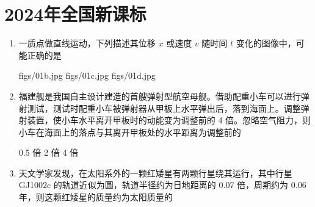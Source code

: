\documentclass[\gkver]{gaokaozhenti}
\begin{document}
\chapter{2024年全国新课标}

\begin{enumerate}
\item
一质点做直线运动，下列描述其位移 $x$ 或速度 $v$ 随时间 $t$ 变化的图像中，可能正确的是

{figs/01b.jpg}
{figs/01c.jpg}
{figs/01d.jpg}


\item
福建舰是我国自主设计建造的首艘弹射型航空母舰。借助配重小车可以进行弹射测试，测试时配重小车被弹射器从甲板上水平弹出后，落到海面上。调整弹射装置，使小车水平离开甲板时的动能变为调整前的 4 倍。忽略空气阻力，则小车在海面上的落点与其离开甲板处的水平距离为调整前的

{0.5 倍}
{2 倍}
{4 倍}


\item
天文学家发现，在太阳系外的一颗红矮星有两颗行星绕其运行，其中行星 GJ1002c 的轨道近似为圆，轨道半径约为日地距离的 0.07 倍，周期约为 0.06 年，则这颗红矮星的质量约为太阳质量的


\end{enumerate}
\end{document}
